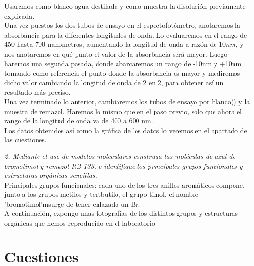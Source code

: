 \noindent Usaremos como blanco agua destilada y como muestra la disolución previamente explicada.\\

\noindent Una vez puestos los dos tubos de ensayo en el espectofotómetro, anotaremos la absorbancia para la diferentes longitudes de onda. Lo evaluaremos en el rango de 450 hasta 700 nanometros, aumentando la longitud de onda a razón de $10 nm$, y nos anotaremos en qué punto el valor de la absorbancia será mayor. Luego haremos una segunda pasada, donde abarcaremos un rango de -10nm y +10nm tomando como referencia el punto donde la absorbancia es mayor y mediremos dicho valor cambiando la longitud de onda de 2 en 2, para obtener así un resultado más preciso.\\


\noindent Una vez terminado lo anterior, cambiaremos los tubos de ensayo por blanco() y la muestra de remazol. Haremos lo mismo que en el paso previo, solo que ahora el rango de la longitud de onda va de 400 a 600 nm. \\

\noindent Los datos obtenidos así como la gráfica de los datos lo veremos en el apartado de las cuestiones.



\vspace{0.6cm}




\noindent \textit{2. Mediante el uso de modelos moleculares construya las moléculas de azul de bromotimol y remazol RB 133, e identifique los principales grupos funcionales y
estructuras orgánicas sencillas.}\\

\noindent Principales grupos funcionales: cada uno de los tres anillos aromáticos compone, junto a los grupos metilos y tertbutilo, el grupo timol, el nombre 'bromotimol'msurge de tener enlazado un Br.\\

\noindent A continuación, expongo unas fotografías de los distintos grupos y estructuras orgánicas que hemos reproducido en el laboratorio:






\clearpage

\section{Cuestiones}

